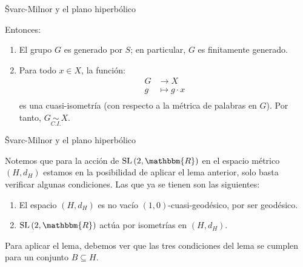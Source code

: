 \documentclass[xcolor=dvipsnames]{beamer}
\theoremstyle{largebreak}
\newcommand{\bbm}[1]{\ensuremath{\mathbbm{#1}}}
\newcommand{\qisom}{\ensuremath{\underset{C.I.}{\sim}}}
\newcommand{\SL}[1]{\ensuremath{\textup{SL}\left(#1\right)}}
\begin{document}
\begin{frame}{Švarc-Milnor y el plano hiperbólico}
    \begin{lema}
        Entonces:
        \begin{enumerate}[label = \textit{(\arabic*)}]
            \item El grupo $G$ es generado por $S$; en particular, $G$ es finitamente generado.
            \item Para todo $x\in X$, la función:
            \begin{equation*}
                \begin{split}
                    G&\rightarrow X\\
                    g&\mapsto g\cdot x\\
                \end{split}
            \end{equation*}
            es una cuasi-isometría (con respecto a la métrica de palabras en $G$). Por tanto, $G\qisom X$.
        \end{enumerate}
    \end{lema}
\end{frame}

\begin{frame}{Švarc-Milnor y el plano hiperbólico}
    \begin{obs}
        Notemos que para la acción de $\SL{2,\bbm{R}}$ en el espacio métrico $(H,d_H)$ estamos en la posibilidad de aplicar el lema anterior, solo basta verificar algunas condiciones. Las que ya se tienen son las siguientes:
        \begin{enumerate}[label = \textit{(\arabic*)}]
            \item El espacio $(H,d_H)$ es no vacío $(1,0)$-cuasi-geodésico, por ser geodésico.
            \item $\SL{2,\bbm{R}}$ actúa por isometrías en $(H,d_H)$.
        \end{enumerate}
        Para aplicar el lema, debemos ver que las tres condiciones del lema se cumplen para un conjunto $B\subseteq H$.
    \end{obs}
\end{frame}
\end{document}
